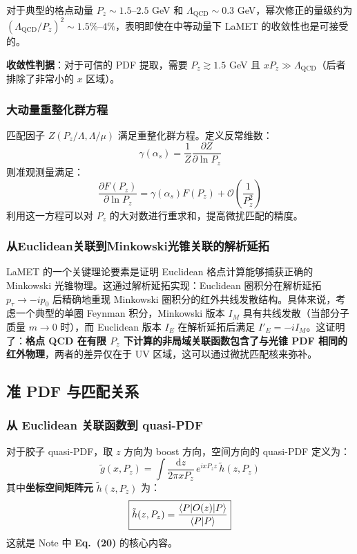 \documentclass[11pt,a4paper]{ctexart}
\newcommand{\order}[1]{\mathcal{O}(#1)}
\begin{document}
对于典型的格点动量 $P_z \sim 1.5\text{--}2.5$ GeV 和 $\Lambda_{\text{QCD}} \sim 0.3$ GeV，幂次修正的量级约为 $(\Lambda_{\text{QCD}}/P_z)^2 \sim 1.5\%\text{--}4\%$，表明即使在中等动量下 LaMET 的收敛性也是可接受的。

\textbf{收敛性判据}：对于可信的 PDF 提取，需要 $P_z \gtrsim 1.5$ GeV 且 $x P_z \gg \Lambda_{\text{QCD}}$（后者排除了非常小的 $x$ 区域）。

\subsubsection{大动量重整化群方程}

匹配因子 $Z(P_z/\Lambda, \Lambda/\mu)$ 满足重整化群方程。定义反常维数：
\begin{equation}
\gamma(\alpha_s) = \frac{1}{Z} \frac{\partial Z}{\partial \ln P_z}
\end{equation}
则准观测量满足：
\begin{equation}
\frac{\partial F(P_z)}{\partial \ln P_z} = \gamma(\alpha_s) F(P_z) + \order{\frac{1}{P_z^{2}}}
\end{equation}
利用这一方程可以对 $P_z$ 的大对数进行重求和，提高微扰匹配的精度。

\subsubsection{从Euclidean关联到Minkowski光锥关联的解析延拓}

LaMET 的一个关键理论要素是证明 Euclidean 格点计算能够捕获正确的 Minkowski 光锥物理。这通过解析延拓实现：Euclidean 圈积分在解析延拓 $p_\tau \to -i p_0$ 后精确地重现 Minkowski 圈积分的红外共线发散结构。具体来说，考虑一个典型的单圈 Feynman 积分，Minkowski 版本 $I_M$ 具有共线发散（当部分子质量 $m \to 0$ 时），而 Euclidean 版本 $I_E$ 在解析延拓后满足 $I'_E = -i I_M$。这证明了：\textbf{格点 QCD 在有限 $P_z$ 下计算的非局域关联函数包含了与光锥 PDF 相同的红外物理}，两者的差异仅在于 UV 区域，这可以通过微扰匹配核来弥补。

\subsection{准 PDF 与匹配关系}

\subsubsection{从 Euclidean 关联函数到 quasi-PDF}

对于胶子 quasi-PDF，取 $z$ 方向为 boost 方向，空间方向的 quasi-PDF 定义为：
\begin{equation}\label{eq:quasi_pdf_def}
\tilde{g}(x, P_z) = \int \frac{\mathrm{d}z}{2\pi x P_z} \,
e^{i x P_z z} \, \tilde{h}(z, P_z)
\end{equation}
其中\textbf{坐标空间矩阵元} $\tilde{h}(z, P_z)$ 为：
\begin{equation}\label{eq:matrix_element}
\boxed{\tilde{h}(z, P_z) = \frac{\braket{P | O(z) | P}}{\braket{P|P}}}
\end{equation}
这就是 Note 中 \textbf{Eq.~(20)} 的核心内容。
\end{document}
